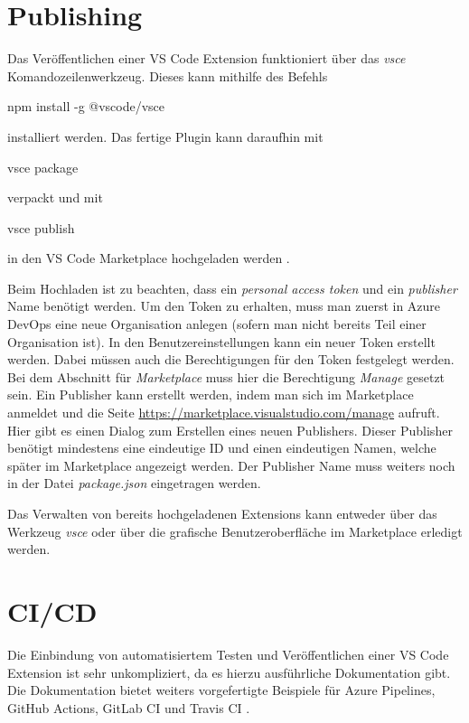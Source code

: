 \section{Publishing}
\label{sec:EntwicklungVsCode_Publishing}

Das Veröffentlichen einer VS Code Extension funktioniert über das 
\emph{vsce} Komandozeilenwerkzeug. Dieses kann mithilfe des Befehls
\begin{GenericCode}[numbers=none]
npm install -g @vscode/vsce
\end{GenericCode}
installiert werden. Das fertige Plugin kann daraufhin mit 
\begin{GenericCode}[numbers=none]
vsce package
\end{GenericCode}
verpackt und mit 
\begin{GenericCode}[numbers=none]
vsce publish
\end{GenericCode}
in den VS Code Marketplace hochgeladen werden \cite{VSCodeExtensionAPIPublishingExtension}.

Beim Hochladen ist zu beachten, dass ein \emph{personal access token}
und ein \emph{publisher} Name benötigt werden.
Um den Token zu erhalten, muss man zuerst in Azure DevOps eine neue Organisation
anlegen (sofern man nicht bereits Teil einer Organisation ist). In den 
Benutzereinstellungen kann ein neuer Token erstellt werden. Dabei müssen auch die 
Berechtigungen für den Token festgelegt werden. Bei dem Abschnitt für 
\emph{Marketplace} muss hier die Berechtigung \emph{Manage} gesetzt sein.
Ein Publisher kann erstellt werden, indem man sich im Marketplace anmeldet
und die Seite \url{https://marketplace.visualstudio.com/manage} aufruft.
Hier gibt es einen Dialog zum Erstellen eines neuen Publishers. Dieser
Publisher benötigt mindestens eine eindeutige ID und einen eindeutigen
Namen, welche später im Marketplace angezeigt werden. Der Publisher Name
muss weiters noch in der Datei \emph{package.json} eingetragen werden.

Das Verwalten von bereits hochgeladenen Extensions kann entweder
über das Werkzeug \emph{vsce} oder über die grafische Benutzeroberfläche
im Marketplace erledigt werden.

\section{CI/CD}
\label{sec:EntwicklungVsCode_CICD}

Die Einbindung von automatisiertem Testen und Veröffentlichen
einer VS Code Extension ist sehr unkompliziert, da es hierzu
ausführliche Dokumentation gibt. Die Dokumentation bietet
weiters vorgefertigte Beispiele für Azure Pipelines, 
GitHub Actions, GitLab CI und Travis CI \cite{VSCodeExtensionAPIContinuousIntegration}.

